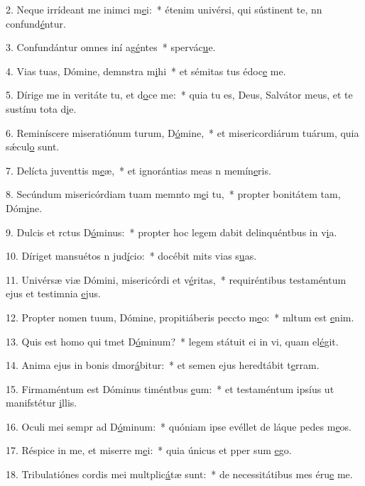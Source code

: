 2. Neque irrídeant me inimci m\uline{e}i:~* étenim univérsi, qui sústinent te, nn confund\uline{é}ntur.\par 
3. Confundántur omnes iní ag\uline{é}ntes~* spervác\uline{u}e.\par 
4. Vias tuas, Dómine, demnstra m\uline{i}hi~* et sémitas tus édoc\uline{e} me.\par 
5. Dírige me in veritáte tu, et d\uline{o}ce me:~* quia tu es, Deus, Salvátor meus, et te sustínu tota d\uline{i}e.\par 
6. Reminíscere miseratiónum turum, D\uline{ó}mine,~* et misericordiárum tuárum, quia  sǽcul\uline{o} sunt.\par 
7. Delícta juventtis m\uline{e}æ,~* et ignorántias meas n memín\uline{e}ris.\par 
8. Secúndum misericórdiam tuam memnto m\uline{e}i tu,~* propter bonitátem tam, Dóm\uline{i}ne.\par 
9. Dulcis et rctus D\uline{ó}minus:~* propter hoc legem dabit delinquéntbus in v\uline{i}a.\par 
10. Díriget mansuétos n jud\uline{í}cio:~* docébit mits vias s\uline{u}as.\par 
11. Univérsæ viæ Dómini, misericórdi et v\uline{é}ritas,~* requiréntibus testaméntum ejus et testimnia \uline{e}jus.\par 
12. Propter nomen tuum, Dómine, propitiáberis peccto m\uline{e}o:~* mltum est \uline{e}nim.\par 
13. Quis est homo qui tmet D\uline{ó}minum?~* legem státuit ei in vi, quam el\uline{é}git.\par 
14. Anima ejus in bonis dmor\uline{á}bitur:~* et semen ejus heredtábit t\uline{e}rram.\par 
15. Firmaméntum est Dóminus timéntbus \uline{e}um:~* et testaméntum ipsíus ut manifstétur \uline{i}llis.\par 
16. Oculi mei sempr ad D\uline{ó}minum:~* quóniam ipse evéllet de láque pedes m\uline{e}os.\par 
17. Réspice in me, et miserre m\uline{e}i:~* quia únicus et pper sum \uline{e}go.\par 
18. Tribulatiónes cordis mei multplic\uline{á}tæ sunt:~* de necessitátibus mes éru\uline{e} me.\par 
